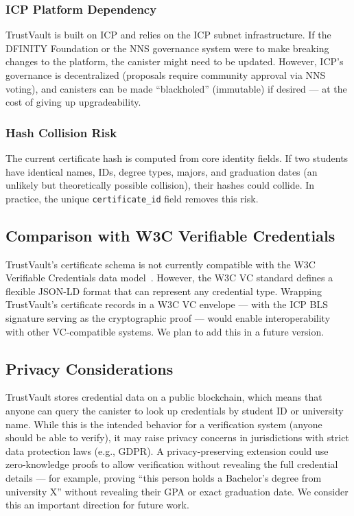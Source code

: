 \documentclass[journal]{IEEEtran}
\begin{document}
\subsubsection{ICP Platform Dependency}
TrustVault is built on ICP and relies on the ICP subnet infrastructure. If the DFINITY Foundation or the NNS governance system were to make breaking changes to the platform, the canister might need to be updated. However, ICP's governance is decentralized (proposals require community approval via NNS voting), and canisters can be made ``blackholed'' (immutable) if desired — at the cost of giving up upgradeability.

\subsubsection{Hash Collision Risk}
The current certificate hash is computed from core identity fields. If two students have identical names, IDs, degree types, majors, and graduation dates (an unlikely but theoretically possible collision), their hashes could collide. In practice, the unique \texttt{certificate\_id} field removes this risk.

\subsection{Comparison with W3C Verifiable Credentials}

TrustVault's certificate schema is not currently compatible with the W3C Verifiable Credentials data model~\cite{w3c2022vc}. However, the W3C VC standard defines a flexible JSON-LD format that can represent any credential type. Wrapping TrustVault's certificate records in a W3C VC envelope — with the ICP BLS signature serving as the cryptographic proof — would enable interoperability with other VC-compatible systems. We plan to add this in a future version.

\subsection{Privacy Considerations}

TrustVault stores credential data on a public blockchain, which means that anyone can query the canister to look up credentials by student ID or university name. While this is the intended behavior for a verification system (anyone should be able to verify), it may raise privacy concerns in jurisdictions with strict data protection laws (e.g., GDPR). A privacy-preserving extension could use zero-knowledge proofs to allow verification without revealing the full credential details — for example, proving ``this person holds a Bachelor's degree from university X'' without revealing their GPA or exact graduation date. We consider this an important direction for future work.
\end{document}
